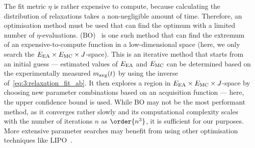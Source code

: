 The fit metric $\eta$ is rather expensive to compute, because calculating the distribution of relaxations takes a non-negligible amount of time.
Therefore, an optimisation method must be used that can find the optimum with a limited number of $\eta$-evaluations.
 (BO)~\cite{bayesopt_package,BayesOpt_Mockus1975} is one such method that can find the extremum of an expensive-to-compute function in a low-dimensional space (here, we only search the $E_\mathrm{EA} \times E_\mathrm{MC} \times J$-space).
This is an iterative method that starts from an initial guess --- estimated values of $E_\mathrm{EA}$ and $E_\mathrm{MC}$ can be determined based on the experimentally measured $m_\mathrm{avg}(t)$ by using the inverse of~\cref{eq:3:relaxation_fit_ab}.
It then explores a region in $E_\mathrm{EA} \times E_\mathrm{MC} \times J$-space by choosing new parameter combinations based on an acquisition function --- here, the upper confidence bound is used.
While BO may not be the most performant method, as it converges rather slowly and its computational complexity scales with the number of iterations $n$ as $\order{n^3}$, it is sufficient for our purposes.
More extensive parameter searches may benefit from using other optimisation techniques like LIPO~\cite{LIPO,LIPO_dlib}.

